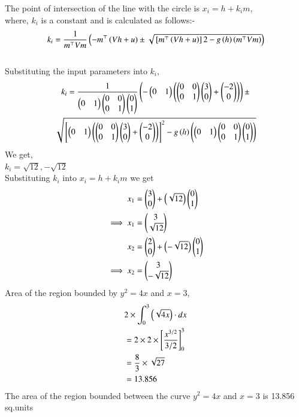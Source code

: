 \documentclass[journal]{IEEEtran}
\begin{document}
The point of intersection of the line with the circle is $x_i=h+k_i m$,\\
where, $k_i$ is a constant and is calculated as follows:-
$$k_i=\frac{1}{m^\top Vm}\left(-m^\top \left(Vh+u\right)\pm \sqrt{{}\left[m^\top \left(Vh+u\right)\right] 2-g\left(h\right)\left(m^\top Vm\right)}\right)$$\\
Substituting the input parameters into $k_i$,\\
\begin{multline}
     k_i =\frac{1}{\begin{pmatrix}0 
 & 1\end{pmatrix}\begin{pmatrix}0 & 0 \\ 0 & 1\end{pmatrix}\begin{pmatrix}0 \\ 1\end{pmatrix}}\left(-\begin{pmatrix}0&1\end{pmatrix}\left(\begin{pmatrix}0&0\\0&1\end{pmatrix}\begin{pmatrix}3\\0\end{pmatrix}+\begin{pmatrix}-2\\0\end{pmatrix}\right)\right)\pm \\
     \sqrt{{}\left[\begin{pmatrix}0&1\end{pmatrix}\left(\begin{pmatrix}0&0\\0&1\end{pmatrix}\begin{pmatrix}3\\0\end{pmatrix}+\begin{pmatrix}-2\\0\end{pmatrix}\right)\right]^2-g\left(h\right)\left(\begin{pmatrix}0&1\end{pmatrix}\begin{pmatrix}0&0\\0&1\end{pmatrix}\begin{pmatrix}0\\1\end{pmatrix}\right)} 
\end{multline}
We get,\\
$k_i= \sqrt{12},-\sqrt{12}$\\
Substituting $k_i$ into $x_i=h+k_i m$ we get\\
\begin{align}
     x_1&=\begin{pmatrix}3\\0\end{pmatrix}+\left(\sqrt{12}\right)\begin{pmatrix}0\\1\end{pmatrix}\\
    \implies x_1 &=\begin{pmatrix}3\\\sqrt{12}\end{pmatrix}\\
    x_2 &=\begin{pmatrix}2\\0\end{pmatrix}+\left(-\sqrt{12}\right)\begin{pmatrix}0\\1\end{pmatrix}\\
    \implies x_2&=\begin{pmatrix}3\\-\sqrt{12}\end{pmatrix}
\end{align}Area of the region bounded by $y^2=4x$ and $x=3$,
\begin{align}
   & 2 \times \int_0^3\left(\sqrt{4x}\right)\cdot dx\\
   &= 2 \times 2 \times\left[ \frac{x^{3/2}}{3/2} \right]_0^3 \\
    &= \frac{8}{3} \times \sqrt{27}\\
    &= 13.856
\end{align}
The area of the region bounded between the curve $y^2=4x$ and $x=3$ is 13.856 sq.units
\end{document}
